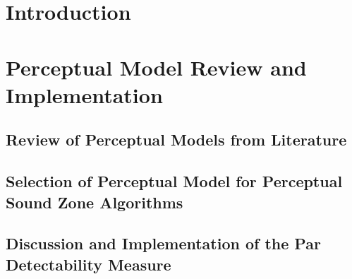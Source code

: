 \documentclass[10pt,twoside,openright,titlepage]{ce}
\begin{document}
\frontmatter
\makecover
\maketitle
\makesignature


\tableofcontents
\mainmatter

\chapter{Introduction}
\label{ch:introduction}

\newpage


\chapter{Perceptual Model Review and Implementation}
\label{ch:perceptual}
% 

\newpage
\section{Review of Perceptual Models from Literature}
\label{ch:perceptual:review}

\newpage
\section{Selection of Perceptual Model for Perceptual Sound Zone Algorithms}
\label{ch:perceptual:selection}

\newpage
\section{Discussion and Implementation of the Par Detectability Measure}
\label{ch:perceptual:implementation}

\newpage
% 
\end{document}
